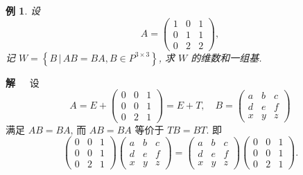 \documentclass[13pt]{beamer}
\newtheorem{exa}{例}
\def\sol{{\bf 解~~ }}
\begin{document}
\begin{frame}
\begin{exa}
设$$
A=\left(\begin{array}{ccc}
1 & 0 & 1 \\
0 & 1 & 1 \\
0 & 2 & 2
\end{array}\right), 
$$
记  $W=\left\{B \, | \, A B=B A, B \in P^{3 \times 3}\right\}$,  求  $W$ 的维数和一组基. 
\end{exa}
\sol 
 设  
 $$
A=E+\left(\begin{array}{ccc}
0 & 0 & 1 \\
0 & 0 & 1 \\
0 & 2 & 1
\end{array}\right)=E+T, \quad
B=\left(\begin{array}{ccc}
a & b & c \\
d & e & f \\
x & y & z
\end{array}\right)$$
 满足 
 $A B=B A$, { 而 } 
 $A B=B A$ { 等价于 } $T B=B T$.
{ 即 }
$$\left(\begin{array}{ccc}
0 & 0 & 1 \\
0 & 0 & 1 \\
0 & 2 & 1
\end{array}\right)\left(\begin{array}{ccc}
a & b & c \\
d & e & f \\
x & y & z
\end{array}\right)=\left(\begin{array}{ccc}
a & b & c \\
d & e & f \\
x & y & z
\end{array}\right)\left(\begin{array}{ccc}
0 & 0 & 1 \\
0 & 0 & 1 \\
0 & 2 & 1
\end{array}\right).$$ 

\end{frame}
\end{document}
